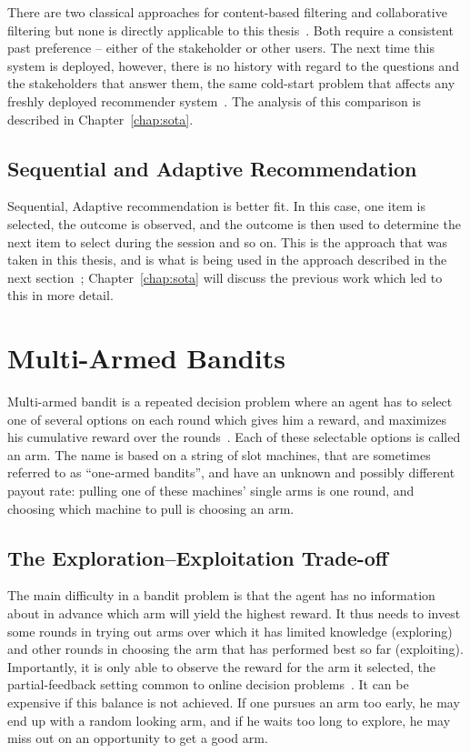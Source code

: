 \documentclass[a4paper, 12pt, oneside, openany, BCOR1cm,toc=chapterentrywithdots]{scrbook}
\begin{document}
There are two classical approaches for content-based filtering and collaborative filtering but
none is directly applicable to this thesis~\cite{lu2012recommendersystems}. Both require a
consistent past preference -- either of the stakeholder or other users. The next time this system
is deployed, however, there is no history with regard to the questions and the stakeholders that
answer them, the same cold-start problem that affects any freshly deployed recommender
system~\cite{rama2019coldstart}. The analysis of this comparison is described in
Chapter~\ref{chap:sota}.

\subsection{Sequential and Adaptive Recommendation}

Sequential, Adaptive recommendation is better fit. In this case, one item is selected, the
outcome is observed, and the outcome is then used to determine the next item to select during the
session and so on. This is the approach that was taken in this thesis, and is what is being used
in the approach described in the next section~\cite{datsogiannis2024early};
Chapter~\ref{chap:sota} will discuss the previous work which led to this in more detail.

\section{Multi-Armed Bandits}

Multi-armed bandit is a repeated decision problem where an agent has to select one of several
options on each round which gives him a reward, and maximizes his cumulative reward over the
rounds~\cite{naeem2020gentleintro,sutton2018reinforcement}. Each of these selectable options is
called an arm. The name is based on a string of slot machines, that are sometimes referred to as
``one-armed bandits'', and have an unknown and possibly different payout rate: pulling one of
these machines' single arms is one round, and choosing which machine to pull is choosing an arm.

\subsection{The Exploration--Exploitation Trade-off}

The main difficulty in a bandit problem is that the agent has no information about in advance
which arm will yield the highest reward. It thus needs to invest some rounds in trying out arms
over which it has limited knowledge (exploring) and other rounds in choosing the arm that has
performed best so far (exploiting). Importantly, it is only able to observe the reward for the
arm it selected, the partial-feedback setting common to online decision
problems~\cite{datsogiannis2024early,naeem2020gentleintro,bechavod2019partialfeedback}. It can be expensive if this
balance is not achieved. If one pursues an arm too early, he may end up with a random looking
arm, and if he waits too long to explore, he may miss out on an opportunity to get a good arm.
\end{document}
